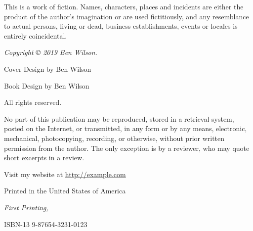 \documentclass[11pt,twoside,makeidx,hidelinks,]{memoir}
\begin{document}
  

  \par\noindent This is a work of fiction. Names, characters, places and incidents are either
  the product of the author's imagination or are used fictitiously, and any resemblance to
  actual persons, living or dead, business establishments, events or locales is entirely
  coincidental.\newline
  

  \par\noindent\emph{Copyright \copyright{} 2019 Ben Wilson.}\newline

  
  \par\noindent Cover Design by Ben Wilson\newline
  

  
  \par\noindent Book Design by Ben Wilson\newline
  

  


  \par\noindent All rights reserved.\newline

  \par\noindent No part of this publication may be reproduced, stored in a retrieval system, posted on the Internet, or transmitted, in any form or by any means, electronic, mechanical, photocopying, recording, or otherwise, without prior written permission from the author. The only exception is by a reviewer, who may quote short excerpts in a review.\newline

  \par\noindent \theauthor
  \par\noindent Visit my website at \url{http://example.com}\newline

  \par\noindent Printed in the United States of America
  \newline

  \par\noindent\textit{First Printing, \usmonthyear{}}
  \newline

  \par\noindent ISBN-13 9-87654-3231-0123
  \vspace*{\fill}
\end{document}
